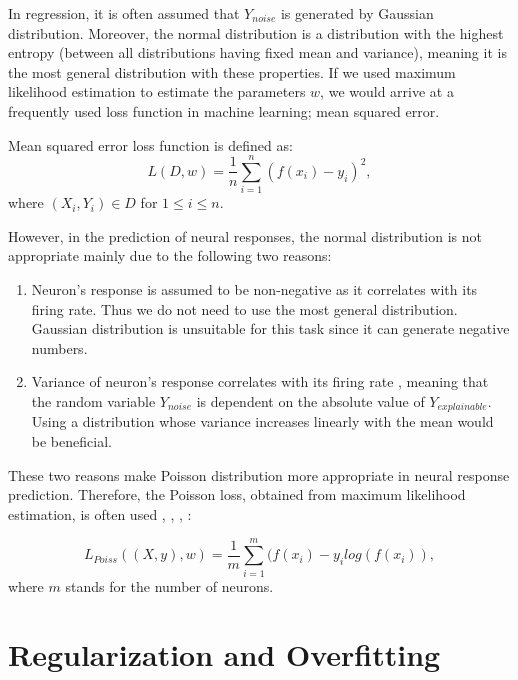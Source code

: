 In regression, it is often assumed that $Y_{noise}$ is generated by Gaussian distribution. Moreover, the normal distribution is a distribution with the highest entropy (between all distributions having fixed mean and variance), meaning it is the most general distribution with these properties. If we used maximum likelihood estimation to estimate the parameters $w$, we would arrive at a frequently used loss function in machine learning; mean squared error.


\begin{defn}\label{def01:5}
	Mean squared error loss function is defined as:
	\begin{equation}
	L(D, w) = \frac{1}{n} \sum_{i=1}^n (f(x_i) - y_i)^2,
	\end{equation}
	where $(X_i, Y_i) \in D$ for $1 \leq i \leq n$.
\end{defn}

However, in the prediction of neural responses, the normal distribution is not appropriate mainly due to the following two reasons:
\begin{enumerate}
	\item Neuron’s response is assumed to be non-negative as it correlates with its firing rate. Thus we do not need to use the most general distribution. Gaussian distribution is unsuitable for this task since it can generate negative numbers.
	\item Variance of neuron’s response correlates with its firing rate \citep{goris2014partitioning}, meaning that the random variable $Y_{noise}$ is dependent on the absolute value of $Y_{explainable}$. Using a distribution whose variance increases linearly with the mean would be beneficial.
\end{enumerate}


These two reasons make Poisson distribution more appropriate in neural response prediction. Therefore, the Poisson loss, obtained from maximum likelihood estimation, is often used \citep{cadena2019deep}, \citep{klindt2017neural}, \citep{sinz2018stimulus}, \citep{lurz2021generalization}:

\begin{defn}\label{def01:6}
	\begin{equation}
		L_{Poiss}((X, y), w) = \frac{1}{m} \sum_{i=1}^m (f(x_i) - y_i log(f(x_i)),
	\end{equation}
	where $m$ stands for the number of neurons.
\end{defn}


\section{Regularization and Overfitting}

